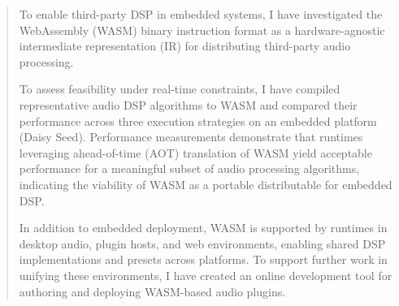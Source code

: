 \documentclass[a4paper]{article}
\begin{document}
\begin{abstract}
To enable third-party DSP in embedded systems, I have investigated the WebAssembly (WASM) binary instruction format as a hardware-agnostic intermediate representation (IR) for distributing third-party audio processing. 

To assess feasibility under real-time constraints, I have compiled representative audio DSP algorithms to WASM and compared their performance across three execution strategies on an embedded platform (Daisy Seed). Performance measurements demonstrate that runtimes leveraging ahead-of-time (AOT) translation of WASM yield acceptable performance for a meaningful subset of audio processing algorithms, indicating the viability of WASM as a portable distributable for embedded DSP. 

In addition to embedded deployment, WASM is supported by runtimes in desktop audio, plugin hosts, and web environments, enabling shared DSP implementations and presets across platforms. To support further work in unifying these environments, I have created an online development tool for authoring and deploying WASM-based audio plugins. 


\end{abstract}

\end{document}
